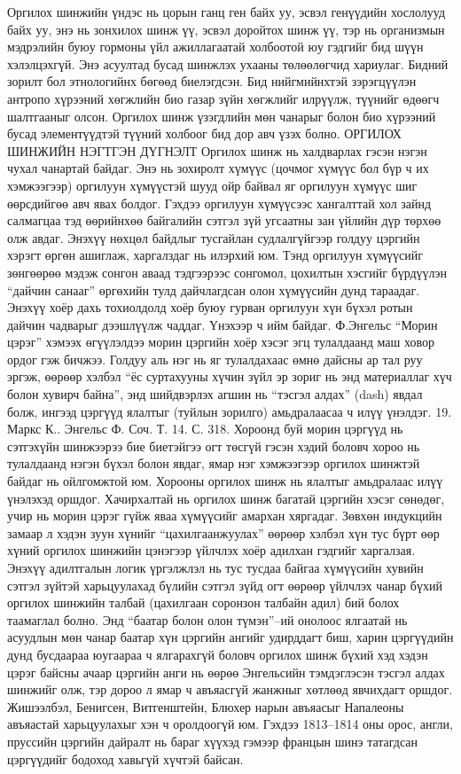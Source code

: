 Оргилох шинжийн үндэс нь цорын ганц ген байх уу, эсвэл генүүдийн хослолууд байх уу, энэ нь зонхилох шинж үү, эсвэл доройтох шинж үү, тэр нь организмын мэдрэлийн буюу гормоны үйл ажиллагаатай холбоотой юу гэдгийг бид шүүн хэлэлцэхгүй. Энэ асуултад бусад шинжлэх ухааны төлөөлөгчид хариулаг. Бидний зорилт бол этнологийнх бөгөөд биелэгдсэн. Бид нийгмийнхтэй зэрэгцүүлэн антропо хүрээний хөгжлийн био газар зүйн хөгжлийг илрүүлж, түүнийг өдөөгч шалтгааныг олсон. Оргилох шинж үзэгдлийн мөн чанарыг болон био хүрээний бусад элементүүдтэй түүний холбоог бид дор авч үзэх болно.
ОРГИЛОХ ШИНЖИЙН НЭГТГЭН ДҮГНЭЛТ
Оргилох шинж нь халдварлах гэсэн нэгэн чухал чанартай байдаг. Энэ нь зохиролт хүмүүс (цочмог хүмүүс бол бүр ч их хэмжээгээр) оргилуун хүмүүстэй шууд ойр байвал яг оргилуун хүмүүс шиг өөрсдийгөө авч явах болдог. Гэхдээ оргилуун хүмүүсээс хангалттай хол зайнд салмагцаа тэд өөрийнхөө байгалийн сэтгэл зүй угсаатны зан үйлийн дүр төрхөө олж авдаг. Энэхүү нөхцөл байдлыг тусгайлан судлалгүйгээр голдуу цэргийн хэрэгт өргөн ашиглаж, харгалздаг нь илэрхий юм. Тэнд оргилуун хүмүүсийг зөнгөөрөө мэдэж сонгон аваад тэдгээрээс сонгомол, цохилтын хэсгийг бүрдүүлэн “дайчин санааг” өргөхийн тулд дайчлагдсан олон хүмүүсийн дунд тараадаг. Энэхүү хоёр дахь тохиолдолд хоёр буюу гурван оргилуун хүн бүхэл ротын дайчин чадварыг дээшлүүлж чаддаг. Үнэхээр ч ийм байдаг.
Ф.Энгельс “Морин цэрэг” хэмээх өгүүлэлдээ морин цэргийн хоёр хэсэг эгц тулалдаанд маш ховор ордог гэж бичжээ. Голдуу аль нэг нь яг тулалдахаас өмнө дайсны ар тал руу эргэж, өөрөөр хэлбэл “ёс суртахууны хүчин зүйл эр зориг нь энд материаллаг хүч болон хувирч байна”, энд шийдвэрлэх агшин нь “тэсгэл алдах” (dash) явдал болж, ингээд цэргүүд ялалтыг (туйлын зорилго) амьдралаасаа ч илүү үнэлдэг. 19. Маркс К.. Энгельс Ф. Соч. Т. 14. С. 318.
Хороонд буй морин цэргүүд нь сэтгэхүйн шинжээрээ бие биетэйгээ огт төсгүй гэсэн хэдий боловч хороо нь тулалдаанд нэгэн бүхэл болон явдаг, ямар нэг хэмжээгээр оргилох шинжтэй байдаг нь ойлгомжтой юм. Хорооны оргилох шинж нь ялалтыг амьдралаас илүү үнэлэхэд оршдог. Хачирхалтай нь оргилох шинж багатай цэргийн хэсэг сөнөдөг, учир нь морин цэрэг гүйж яваа хүмүүсийг амархан хяргадаг. Зөвхөн индукцийн замаар л хэдэн зуун хүнийг “цахилгаанжуулах” өөрөөр хэлбэл хүн тус бүрт өөр хүний оргилох шинжийн цэнэгээр үйлчлэх хоёр адилхан гэдгийг харгалзая. Энэхүү адилтгалын логик үргэлжлэл нь тус тусдаа байгаа хүмүүсийн хувийн сэтгэл зүйтэй харьцуулахад бүлийн сэтгэл зүйд огт өөрөөр үйлчлэх чанар бүхий оргилох шинжийн талбай (цахилгаан соронзон талбайн адил) бий болох таамаглал болно.
Энд “баатар болон олон түмэн”–ий онолоос ялгаатай нь асуудлын мөн чанар баатар хүн цэргийн ангийг удирддагт биш, харин цэргүүдийн дунд бусдаараа юугаараа ч ялгарахгүй боловч оргилох шинж бүхий хэд хэдэн цэрэг байсны ачаар цэргийн анги нь өөрөө Энгельсийн тэмдэглэсэн тэсгэл алдах шинжийг олж, тэр дороо л ямар ч авъяасгүй жанжныг хөтлөөд явчихдагт оршдог. Жишээлбэл, Бенигсен, Витгенштейн, Блюхер нарын авъяасыг Напалеоны авъяастай харьцуулахыг хэн ч оролдоогүй юм. Гэхдээ 1813–1814 оны орос, англи, пруссийн цэргийн дайралт нь бараг хүүхэд гэмээр францын шинэ татагдсан цэргүүдийг бодоход хавьгүй хүчтэй байсан.
